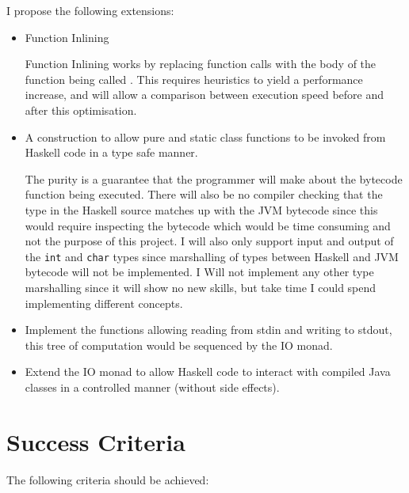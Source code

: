\documentclass[a4paper]{article}
\begin{document}
  I propose the following extensions:

  \begin{itemize}
    \item Function Inlining

      Function Inlining works by replacing function calls with the body of the function being called \cite{ghc-inliner}.
      This requires heuristics to yield a performance increase, and will allow a comparison between execution speed before and after this optimisation.

    \item A construction to allow pure and static class functions to be invoked from Haskell code in a type safe manner.

      The purity is a guarantee that the programmer will make about the bytecode function being executed.
      There will also be no compiler checking that the type in the Haskell source matches up with the JVM bytecode since this would require inspecting the bytecode which
      would be time consuming and not the purpose of this project. I will also only support input and output of the \texttt{int} and \texttt{char} types since
      marshalling of types between Haskell and JVM bytecode will not be implemented. I Will not implement any other type marshalling since it will show no new
      skills, but take time I could spend implementing different concepts.

    \item Implement the functions allowing reading from stdin and writing to stdout, this tree of computation would be sequenced by the IO monad.

    \item Extend the IO monad to allow Haskell code to interact with compiled Java classes in a controlled manner (without side effects).

  \end{itemize}

  \section*{Success Criteria}

  The following criteria should be achieved:
\end{document}

